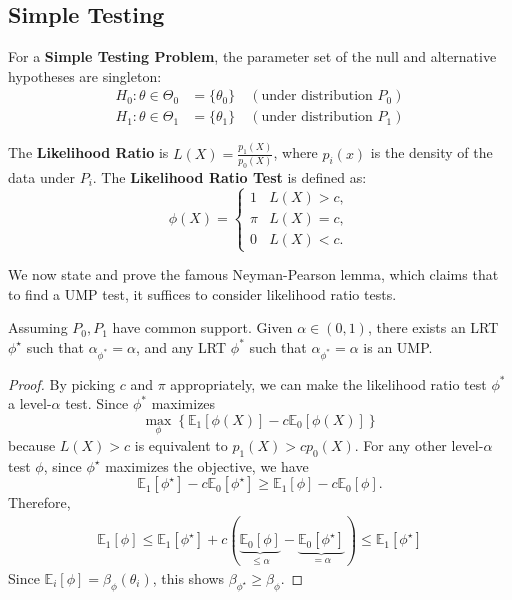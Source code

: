 \subsection{Simple Testing}
\begin{de}
    For a \textbf{Simple Testing Problem}, the parameter set of the null and alternative hypotheses are singleton:
\begin{align*}
    H_0: \theta \in \Theta_0 &= \{\theta_0\} \quad (\text{under distribution } P_0) \\
    H_1: \theta \in \Theta_1 &= \{\theta_1\} \quad (\text{under distribution } P_1)
\end{align*}
\end{de}

\begin{de}
    The \textbf{Likelihood Ratio} is $L(X) = \frac{p_1(X)}{p_0(X)}$, where $p_i(x)$ is the density of the data under $P_i$.
The \textbf{Likelihood Ratio Test} is defined as:
$$
\phi(X) =
\begin{cases}
    1 & L(X) > c, \\
    \pi & L(X) = c, \\
    0 & L(X) < c.
\end{cases}
$$
\end{de}

We now state and prove the famous Neyman-Pearson lemma, which claims that to find a UMP test, it suffices to consider likelihood ratio tests.
\begin{lem}
    Assuming $P_0, P_1$ have common support. Given $\alpha \in (0,1)$, there exists an LRT $\phi^{\star}$ such that $\alpha_{\phi^*}=\alpha$, and any LRT $\phi^*$ such that $\alpha_{\phi^*}=\alpha$ is an UMP.
\end{lem}
\begin{proof}
   By picking $c$ and $\pi$ appropriately, we can make the likelihood ratio test $\phi^*$ a level-$\alpha$ test. Since $\phi^*$ maximizes
   $$
   \max_{\phi} \left\{ \mathbb{E}_1[\phi(X)] - c \mathbb{E}_0[\phi(X)] \right\}
   $$
   because $L(X)>c$ is equivalent to $p_1(X)>cp_0(X)$. For any other level-$\alpha$ test $\phi$, since $\phi^{\star}$ maximizes the objective, we have
\[
\mathbb{E}_1[\phi^{\star}] - c \mathbb{E}_0[\phi^{\star}]\ge \mathbb{E}_1[\phi] - c \mathbb{E}_0[\phi].
\]
Therefore,
\begin{align*}
    \mathbb{E}_1[\phi] \le \mathbb{E}_1[\phi^{\star}] + c (\underbrace{\mathbb{E}_0[\phi]}_{\le \alpha} - \underbrace{\mathbb{E}_0[\phi^{\star}]}_{= \alpha}) \le \mathbb{E}_1[\phi^{\star}]
\end{align*}
Since $\mathbb{E}_i[\phi] = \beta_{\phi}(\theta_i)$, this shows $\beta_{\phi^{\star}} \ge \beta_{\phi}$.
\end{proof}

